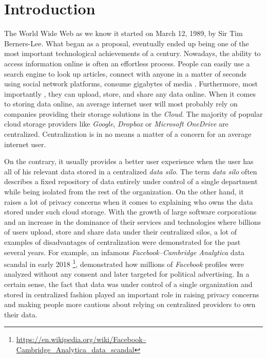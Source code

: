 \chapter*{Introduction}
\label{chap:introduction}

The World Wide Web as we know it started on March 12, 1989, by Sir Tim Berners-Lee. What began as a proposal, eventually ended up being one of the most important technological achievements of a century. Nowadays, the ability to access information online is often an effortless process. People can easily use a search engine to look up articles, connect with anyone in a matter of seconds using social network platforms, consume gigabytes of media \cite{www_foundation_intro}. Furthermore, most importantly , they can upload, store, and share any data online. When it comes to storing data online, an average  internet user will most probably rely on companies providing their storage solutions in the \textit{Cloud}. The majority of popular cloud storage providers like \textit{Google}, \textit{Dropbox} or \textit{Microsoft OneDrive} are centralized. Centralization is in no means a matter of a concern for an average internet user.

On the contrary, it usually provides a better user experience when the user has all of his relevant data stored in a centralized \textit{data silo}. The term \textit{data silo} often describes a fixed repository of data entirely under control of a single department while being isolated from the rest of the organization. On the other hand, it raises a lot of privacy concerns when it comes to explaining who owns the data stored under such cloud storage. With the growth of large software corporations and an increase in the dominance of their services and technologies where billions of users upload, store and share data under their centralized silos, a lot of examples of disadvantages of centralization were demonstrated for the past several years. For example, an infamous \textit{Facebook–Cambridge Analytica} data scandal in early 2018 \footnote{\url{https://en.wikipedia.org/wiki/Facebook–Cambridge_Analytica_data_scandal}}, demonstrated how millions of \textit{Facebook} profiles were analyzed without any consent and later targeted for political advertising. In a certain sense, the fact that data was under control of a single organization and stored in centralized fashion played an important role in raising privacy concerns and making people more cautious about relying on centralized providers to own their data.

